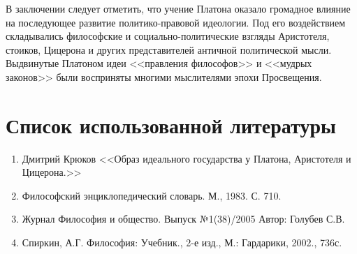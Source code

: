 	В заключении следует отметить, что учение Платона оказало громадное 
	влияние на последующее развитие политико-правовой идеологии. Под его 
	воздействием складывались философские и социально-политические взгляды 
	Аристотеля, стоиков, Цицерона и других представителей античной политической 
	мысли. Выдвинутые Платоном идеи <<правления философов>> и <<мудрых законов>> 
	были восприняты многими мыслителями эпохи Просвещения.

\pagebreak

\chapter{Список использованной литературы}
\begin{enumerate}
	\item Дмитрий Крюков <<Образ идеального государства у Платона, Аристотеля и Цицерона.>>
	\item Философский энциклопедический словарь. М., 1983. С. 710.
	\item Журнал Философия и общество. Выпуск №1(38)/2005 Автор: Голубев С.В.
	\item Спиркин, А.Г. Философия: Учебник., 2-е изд., М.: Гардарики, 2002., 736с.
\end{enumerate}
